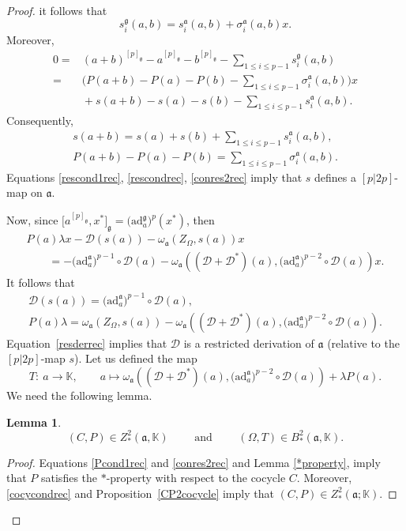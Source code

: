 \documentclass[pdftex]{sigma}
\numberwithin{equation}{section}
\newtheorem{Lemma}[Theorem]{Lemma}
\begin{document}
\begin{proof}
it follows that
\[
s^\mathfrak{g}_i(a,b)=s_i^{\mathfrak{a}}(a,b)+\sigma_i^{\mathfrak{a}}(a,b)x.
\]
Moreover,
\begin{align*}
0={}&(a+b)^{[p]_\mathfrak{g}}-a^{[p]_\mathfrak{g}}-b^{[p]_\mathfrak{g}}- \sum_{1\leq i \leq p-1}s_i^\mathfrak{g}(a,b)\\
={}&\bigg( P(a+b)-P(a)-P(b)- \sum_{1\leq i \leq p-1}\sigma_i^{\mathfrak{a}}(a,b) \bigg) x\\
&{}+s(a+b)-s(a)-s(b)- \sum_{1\leq i \leq p-1}s_i^{\mathfrak{a}}(a,b).
\end{align*}
Consequently,
\begin{gather}
s(a+b)=s(a)+s(b)+ \sum_{1\leq i \leq p-1}s_i^{\mathfrak{a}}(a,b), \label{conres2rec}\\
P(a+b)-P(a)-P(b)= \sum_{1\leq i \leq p-1}\sigma_i^{\mathfrak{a}}(a,b).\nonumber %
 \end{gather}
Equations \eqref{rescond1rec}, \eqref{rescondrec}, \eqref{conres2rec} imply that $s$ defines a $[p|2p]$-map on $\mathfrak{a}$.


Now, since $\big[a^{[p]_\mathfrak{g}},x^*\big]_\mathfrak{g}=\bigl(\mathrm{ad}_a^\mathfrak{g}\bigr)^p(x^*)$, then
\begin{gather*}
P(a) \lambda x-\mathscr D (s(a)) - \omega_\mathfrak{a} (Z_\Omega, s(a))x \\
\qquad{} = - \bigl(\mathrm{ad}_a^\mathfrak{a}\bigr)^{p-1}\circ \mathscr D(a) - \omega_\mathfrak{a} (({\mathscr D}+{\mathscr D}^*)(a), \bigl(\mathrm{ad}_a^\mathfrak{a}\bigr)^{p-2} \circ {\mathscr D}(a))x.
\end{gather*}
It follows that
\begin{gather}
\mathscr D (s(a)) = \bigl(\mathrm{ad}_a^\mathfrak{a}\bigr)^{p-1}\circ \mathscr D(a),\label{resderrec} \\
P(a) \lambda = \omega_\mathfrak{a} (Z_\Omega, s(a)) - \omega_\mathfrak{a} (({\mathscr D}+{\mathscr D}^*)(a),\bigl(\mathrm{ad}_a^\mathfrak{a}\bigr)^{p-2} \circ {\mathscr D}(a)).\label{Pcbound}
\end{gather}
Equation~\eqref{resderrec} implies that ${\mathscr D}$ is a restricted derivation of $\mathfrak{a}$ (relative to the $[p|2p]$-map $s$). Let us defined the map
\[
T\colon\ a\rightarrow \mathbb K, \qquad a \mapsto \omega_\mathfrak{a} (({\mathscr D}+{\mathscr D}^*)(a),\bigl(\mathrm{ad}_a^\mathfrak{a}\bigr)^{p-2} \circ {\mathscr D}(a)) + \lambda P(a).
\]
We need the following lemma.
\begin{Lemma}
\[
(C,P)\in Z^2_{*} (\mathfrak{a}, \mathbb K)\qquad \text{ and }\qquad(\Omega,T)\in B^2_{*} (\mathfrak{a}, \mathbb K).
\]
\end{Lemma}
\begin{proof}
Equations \eqref{Pcond1rec} and \eqref{conres2rec} and Lemma \ref{*property}, imply that $P$ satisfies the $*$-property with respect to the cocycle $C$. Moreover, \eqref{cocycondrec} and Proposition~\ref{CP2cocycle} imply that $(C, P)\in Z^2_* (\mathfrak{a}; \mathbb K)$.


\end{proof}
\end{proof}
\end{document}
